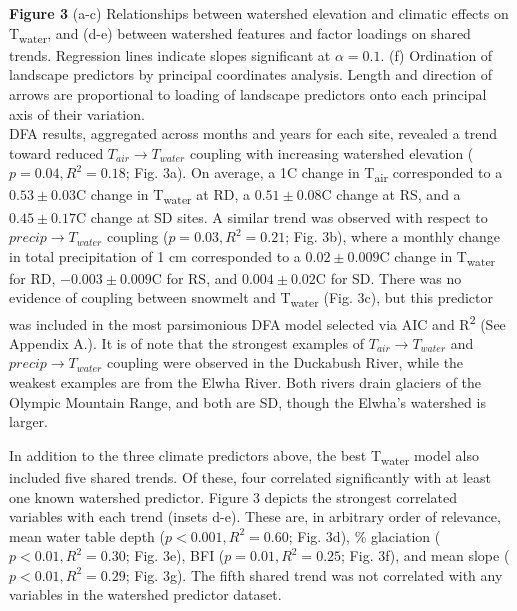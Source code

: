 \documentclass[notitlepage]{article}
\begin{document}
\textbf{Figure 3} (a-c) Relationships between watershed elevation and climatic effects on T\textsubscript{water}, and (d-e) between watershed features and factor loadings on shared trends. Regression lines indicate slopes significant at $\alpha=0.1$. (f) Ordination of landscape predictors by principal coordinates analysis. Length and direction of arrows are proportional to loading of landscape predictors onto each principal axis of their variation.
\\[\baselineskip]

DFA results, aggregated across months and years for each site, revealed a trend toward reduced $T_{air}\rightarrow T_{water}$ coupling with increasing watershed elevation ($p=0.04, R^2=0.18$; Fig. 3a). On average, a 1\degree C change in T\textsubscript{air} corresponded to a $0.53\pm 0.03$\degree C change in T\textsubscript{water} at RD, a $0.51\pm 0.08$\degree C change at RS, and a $0.45\pm 0.17$\degree C change at SD sites. A similar trend was observed with respect to $precip\rightarrow T_{water}$ coupling ($p=0.03, R^2=0.21$; Fig. 3b), where a monthly change in total precipitation of 1 cm corresponded to a $0.02\pm 0.009$\degree C change in T\textsubscript{water} for RD, $-0.003\pm 0.009$\degree C for RS, and $0.004\pm 0.02$\degree C for SD. There was no evidence of coupling between snowmelt and T\textsubscript{water} (Fig. 3c), but this predictor was included in the most parsimonious DFA model selected via AIC and R\textsuperscript{2} (See Appendix A.). It is of note that the strongest examples of $T_{air}\rightarrow T_{water}$ and $precip\rightarrow T_{water}$ coupling were observed in the Duckabush River, while the weakest examples are from the Elwha River. Both rivers drain glaciers of the Olympic Mountain Range, and both are SD, though the Elwha's watershed is larger.

In addition to the three climate predictors above, the best T\textsubscript{water} model also included five shared trends. Of these, four correlated significantly with at least one known watershed predictor. Figure 3 depicts the strongest correlated variables with each trend (insets d-e). These are, in arbitrary order of relevance, mean water table depth ($p<0.001, R^2=0.60$; Fig. 3d), \% glaciation ($p<0.01, R^2=0.30$; Fig. 3e), BFI ($p=0.01, R^2=0.25$; Fig. 3f), and mean slope ($p<0.01, R^2=0.29$; Fig. 3g). The fifth shared trend was not correlated with any variables in the watershed predictor dataset.
\end{document}
